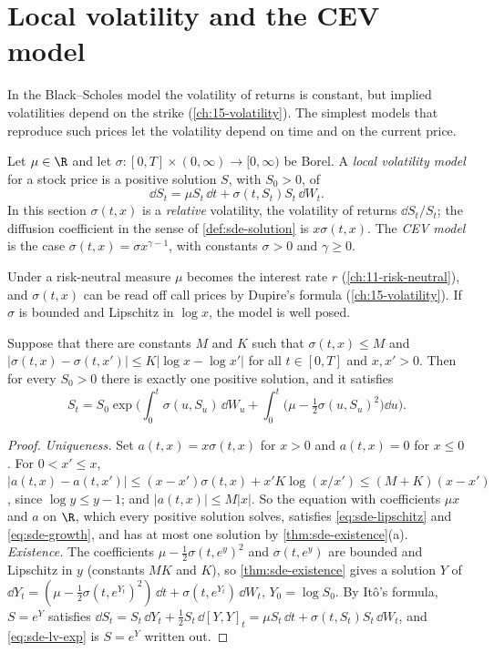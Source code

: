 \section{Local volatility and the CEV model}\label{sec:sde-local-vol}

In the Black--Scholes model the volatility of returns is constant, but implied volatilities
depend on the strike (\cref{ch:15-volatility}). The simplest models that reproduce such
prices let the volatility depend on time and on the current price.

\begin{definition}\label{def:sde-local-vol}
Let $\mu\in\R$ and let $\sigma:[0,T]\times(0,\infty)\to[0,\infty)$ be Borel. A \emph{local
volatility model} for a stock price is a positive solution $S$, with $S_0>0$, of
\[
  \dd S_t=\mu S_t\,\dd t+\sigma(t,S_t)S_t\,\dd W_t .
\]
In this section $\sigma(t,x)$ is a \emph{relative} volatility, the volatility of returns
$\dd S_t/S_t$; the diffusion coefficient in the sense of \cref{def:sde-solution} is
$x\sigma(t,x)$. The \emph{CEV model} is the case $\sigma(t,x)=\sigma x^{\gamma-1}$, with
constants $\sigma>0$ and $\gamma\ge0$.
\end{definition}

Under a risk-neutral measure $\mu$ becomes the interest rate $r$ (\cref{ch:11-risk-neutral}),
and $\sigma(t,x)$ can be read off call prices by Dupire's formula (\cref{ch:15-volatility}).
If $\sigma$ is bounded and Lipschitz in $\log x$, the model is well posed.

\begin{proposition}\label{prop:sde-lv}
Suppose that there are constants $M$ and $K$ such that $\sigma(t,x)\le M$ and
$|\sigma(t,x)-\sigma(t,x')|\le K|\log x-\log x'|$ for all $t\in[0,T]$ and $x,x'>0$. Then
for every $S_0>0$ there is exactly one positive solution, and it satisfies
\begin{equation}\label{eq:sde-lv-exp}
  S_t=S_0\exp\Big(\int_0^t\sigma(u,S_u)\,\dd W_u+\int_0^t\big(\mu-\tfrac12\sigma(u,S_u)^2\big)\dd u\Big).
\end{equation}
\end{proposition}

\begin{proof}
\emph{Uniqueness.} Set $a(t,x)=x\sigma(t,x)$ for $x>0$ and $a(t,x)=0$ for $x\le0$. For
$0<x'\le x$, $|a(t,x)-a(t,x')|\le(x-x')\sigma(t,x)+x'K\log(x/x')\le(M+K)(x-x')$, since
$\log y\le y-1$; and $|a(t,x)|\le M|x|$. So the equation with coefficients $\mu x$ and $a$ on
$\R$, which every positive solution solves, satisfies \eqref{eq:sde-lipschitz} and
\eqref{eq:sde-growth}, and has at most one solution by \cref{thm:sde-existence}(a).
\emph{Existence.} The coefficients $\mu-\frac12\sigma(t,e^y)^2$ and $\sigma(t,e^y)$ are
bounded and Lipschitz in $y$ (constants $MK$ and $K$), so \cref{thm:sde-existence} gives a
solution $Y$ of $\dd Y_t=(\mu-\frac12\sigma(t,e^{Y_t})^2)\,\dd t+\sigma(t,e^{Y_t})\,\dd W_t$,
$Y_0=\log S_0$. By It\^o's formula, $S=e^Y$ satisfies
$\dd S_t=S_t\,\dd Y_t+\frac12S_t\,\dd[Y,Y]_t=\mu S_t\,\dd t+\sigma(t,S_t)S_t\,\dd W_t$, and
\eqref{eq:sde-lv-exp} is $S=e^Y$ written out.
\end{proof}

